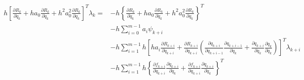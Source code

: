 \documentclass{beamer}
\newcommand{\pd}[2]{\frac{\partial #1}{\partial #2}}
\begin{document}
\begin{frame}[allowframebreaks]
{    \begin{equation}
      \begin{split}
        h \left[ \pd{R_k}{\ddot{q}_k} + h a_0 \pd{R_k}{\dot{q}_k} +  h^2 a_0^2  \pd{R_k}{{q}_k} \right]^T \lambda_k = & -  h \left\{ \pd{R_k}{\ddot{q}_k} + h a_0 \pd{R_k}{\dot{q}_k} +  h^2 a_0^2  \pd{R_k}{{q}_k} \right\}^T\\
        & - h \sum_{i=0}^{m-1} a_i \psi_{k+i} \\
        & - h \sum_{i=1}^{m-1} h \left[ ha_i \pd{R_{k+i}}{\dot{q}_{k+i}} + \pd{R_{k+i}}{q_{k+i}} \left( \pd{q_{k+i}}{q_{k+i-1}}  \pd{q_{k+i-1}} {\ddot{q}_k} +  \pd{q_{k+i}}{\dot{q}_{k}} \pd{\dot{q}_{k}} {\ddot{q}_k} \right) \right]^T \lambda_{k+i}\\
        & - h \sum_{i=1}^{m-1} h \left\{ \pd{f_{k+i}}{\dot{q}_{k+i}}\pd{\dot{q}_{k+i}}{\ddot{q}_k} + \pd{f_{k+i}}{q_{k+i}}\pd{q_{k+i}}{\ddot{q}_k} \right\}^T
      \end{split}
    \end{equation}

  } %
  
\end{frame}
\end{document}
